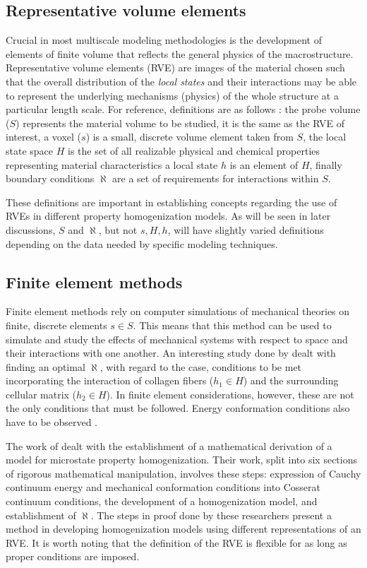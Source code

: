 \subsection{Representative volume elements}

Crucial in most multiscale modeling methodologies is the development of elements of finite volume that reflects the general physics of the macrostructure.
Representative volume elements (RVE) are images of the material chosen such that the overall distribution of the \emph{local states} and their interactions may be able to represent the underlying mechanisms (physics) of the whole structure at a particular length scale.
For reference, definitions are as follows \cite{yabansu14,gupta15,bunge,cnn,sun17,polar,bone}: the probe volume ($S$) represents the material volume to be studied, it is the same as the RVE of interest, a voxel ($s$) is a small, discrete volume element taken from $S$, the local state space $H$ is the set of all realizable physical and chemical properties representing material characteristics a local state $h$ is an element of $H$, finally boundary conditions $\aleph$ are a set of requirements for interactions within $S$.

These definitions are important in establishing concepts regarding the use of RVEs in different property homogenization models.
As will be seen in later discussions, $S$ and $\aleph$, but not $s, H, h$, will have slightly varied definitions depending on the data needed by specific modeling techniques.

\subsection{Finite element methods}

Finite element methods rely on computer simulations of mechanical theories on finite, discrete elements $s \in S$.
This means that this method can be used to simulate and study the effects of mechanical systems with respect to space and their interactions with one another.
An interesting study done by  dealt with finding an optimal $\aleph$, with regard to the case, conditions to be met incorporating the interaction of collagen fibers ($h_1 \in H$) and the surrounding cellular matrix ($h_2 \in H$).
In finite element considerations, however, these are not the only conditions that must be followed.
Energy conformation conditions also have to be observed \cite{cosserat}.

The work of  dealt with the establishment of a mathematical derivation of a model for microstate property homogenization.
Their work, split into six sections of rigorous mathematical manipulation, involves these steps: expression of Cauchy continuum energy and mechanical conformation conditions into Cosserat continuum conditions, the development of a homogenization model, and establishment of $\aleph$.
The steps in proof done by these researchers present a method in developing homogenization models using different representations of an RVE.
It is worth noting that the definition of the RVE is flexible for as long as proper conditions are imposed.


